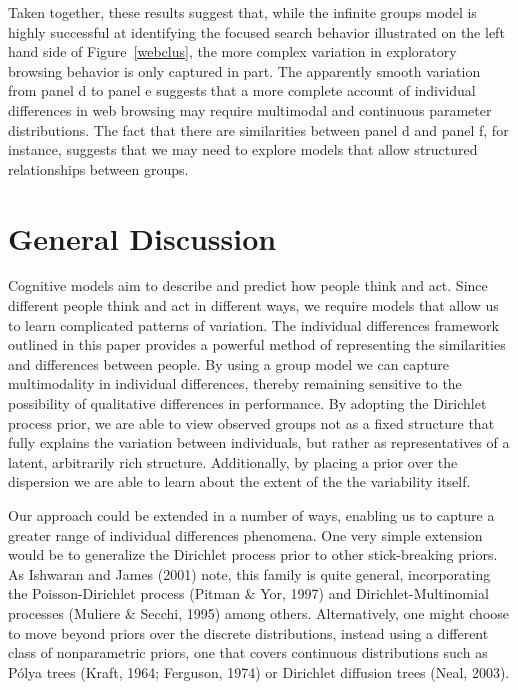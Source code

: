 \documentclass[authoryear]{elsarticle}
\begin{document}
Taken together, these results suggest that, while the infinite groups model is
highly successful at identifying the focused search behavior illustrated on the
left hand side of Figure~\ref{webclus}, the more complex variation in exploratory
browsing behavior is only captured in part. The apparently smooth variation
from panel d to panel e suggests that a more complete account of individual
differences in web browsing may require multimodal and continuous parameter
distributions. The fact that there are similarities between panel d and panel f, for
instance, suggests that we may need to explore models that allow structured
relationships between groups.

\section{General Discussion}

Cognitive models aim to describe and predict how people think and act. Since
different people think and act in different ways, we require models that allow us
to learn complicated patterns of
variation. The individual differences framework outlined
in this paper provides a powerful method of representing the similarities
and differences between people. By using a group model we can
capture multimodality in individual differences, thereby remaining
sensitive to the possibility of qualitative differences in performance. By
adopting the Dirichlet process prior, we are able to view observed groups not as
 a fixed structure that fully explains the variation between individuals,
but rather as representatives of a latent, arbitrarily rich structure.
Additionally, by placing a prior over the dispersion we are able to learn about the extent of the
the variability itself.

Our approach could be extended in a number of ways, enabling
us to capture a greater range of individual differences phenomena.
One very simple extension would be to generalize the Dirichlet process prior
to other stick-breaking priors. As Ishwaran and James (2001) note, this family
is quite general, incorporating the Poisson-Dirichlet process
(Pitman \& Yor, 1997) and Dirichlet-Multinomial processes (Muliere \& Secchi, 1995)
among others.
Alternatively, one might choose to move beyond priors over the discrete distributions,
instead using a  different class of nonparametric priors, one that
covers continuous  distributions such as P\'{o}lya trees (Kraft, 1964; Ferguson, 1974)
or Dirichlet diffusion trees (Neal, 2003).
\end{document}

